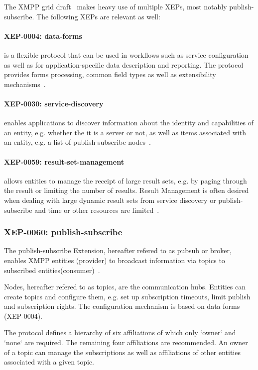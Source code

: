 The XMPP grid draft~\cite{ietf-mile-xmpp-grid-05} makes heavy use of multiple XEPs, most notably \gls{publish-subscribe}. The following XEPs are relevant as well:

\paragraph{XEP-0004: \gls{data-forms}} is a flexible protocol that can be used in workflows such as service configuration as well as for application-specific data description and reporting. The protocol provides forms processing, common field types as well as extensibility mechanisms~\cite{xep-0004}.

\paragraph{XEP-0030: \gls{service-discovery}} enables applications to discover information about the identity and capabilities of an entity, e.g. whether the it is a server or not, as well as items associated with an entity, e.g. a list of \gls{publish-subscribe} nodes~\cite{xep-0030}.

\paragraph{XEP-0059: \Gls{result-set-management}} allows entities to manage the receipt of large result sets, e.g. by paging through the result or limiting the number of results. Result Management is often desired when dealing with large dynamic result sets from service discovery or publish-subscribe and time or other resources are limited~\cite{xep-0059}.

\subsubsection{XEP-0060: \Gls{publish-subscribe}}
The \gls{publish-subscribe} Extension, hereafter refered to as \gls{pubsub} or \gls{broker}, enables XMPP entities (\gls{provider}) to broadcast information via \glspl{topic} to subscribed entities(\gls{consumer})~\cite{xep-0060}.

Nodes, hereafter refered to as \glspl{topic}, are the communication hubs. Entities can create topics and configure them, e.g. set up subscription timeouts, limit publish and subscription rights. The configuration mechanism is based on data forms (XEP-0004).

The protocol defines a hierarchy of six affiliations of which only `owner` and `none` are required. The remaining four affiliations are recommended. An owner of a topic can manage the subscriptions as well as affiliations of other entities associated with a given topic.

